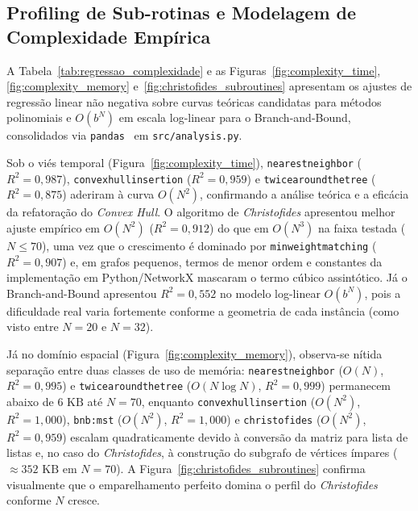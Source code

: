 \documentclass[12pt,a4paper]{article}
\renewcommand{\_}{\origunderscore\hspace{0pt}}
\begin{document}
\subsection{Profiling de Sub-rotinas e Modelagem de Complexidade Empírica}
A Tabela~\ref{tab:regressao_complexidade} e as Figuras~\ref{fig:complexity_time}, \ref{fig:complexity_memory} e~\ref{fig:christofides_subroutines} apresentam os ajustes de regressão linear não negativa sobre curvas teóricas candidatas para métodos polinomiais e $O(b^N)$ em escala log-linear para o Branch-and-Bound, consolidados via \texttt{pandas}~\cite{pandas_docs} em \texttt{src/analysis.py}.

Sob o viés temporal (Figura~\ref{fig:complexity_time}), \texttt{nearest\_neighbor} ($R^2 = 0{,}987$), \texttt{convex\_hull\_insertion} ($R^2 = 0{,}959$) e \texttt{twice\_around\_the\_tree} ($R^2 = 0{,}875$) aderiram à curva $O(N^2)$, confirmando a análise teórica e a eficácia da refatoração do \textit{Convex Hull}. O algoritmo de \textit{Christofides} apresentou melhor ajuste empírico em $O(N^2)$ ($R^2 = 0{,}912$) do que em $O(N^3)$ na faixa testada ($N \le 70$), uma vez que o crescimento é dominado por \texttt{min\_weight\_matching} ($R^2 = 0{,}907$) e, em grafos pequenos, termos de menor ordem e constantes da implementação em Python/NetworkX mascaram o termo cúbico assintótico. Já o Branch-and-Bound apresentou $R^2 = 0{,}552$ no modelo log-linear $O(b^N)$, pois a dificuldade real varia fortemente conforme a geometria de cada instância (como visto entre $N=20$ e $N=32$).

Já no domínio espacial (Figura~\ref{fig:complexity_memory}), observa-se nítida separação entre duas classes de uso de memória: \texttt{nearest\_neighbor} ($O(N)$, $R^2 = 0{,}995$) e \texttt{twice\_around\_the\_tree} ($O(N \log N)$, $R^2 = 0{,}999$) permanecem abaixo de $6\text{ KB}$ até $N=70$, enquanto \texttt{convex\_hull\_insertion} ($O(N^2)$, $R^2 = 1{,}000$), \texttt{bnb:mst} ($O(N^2)$, $R^2 = 1{,}000$) e \texttt{christofides} ($O(N^2)$, $R^2 = 0{,}959$) escalam quadraticamente devido à conversão da matriz para lista de listas e, no caso do \textit{Christofides}, à construção do subgrafo de vértices ímpares ($\approx 352\text{ KB}$ em $N=70$). A Figura~\ref{fig:christofides_subroutines} confirma visualmente que o emparelhamento perfeito domina o perfil do \textit{Christofides} conforme $N$ cresce.
\end{document}
